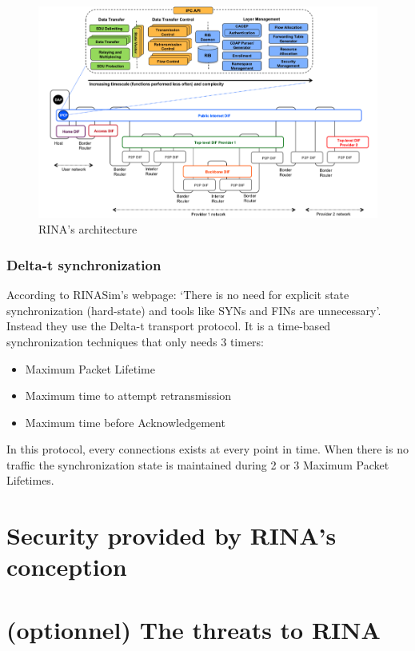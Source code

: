\documentclass[a4paper]{proc}
\begin{document}
\begin{figure}
    \centering\includegraphics[width=\columnwidth]{arch.png}\caption{RINA's architecture}\label{fig:arch}
\end{figure}

\section{Delta-t synchronization}
According to RINASim's webpage: `There is no need for explicit state synchronization (hard-state) and tools like SYNs and FINs are unnecessary'.
Instead they use the Delta-t transport protocol\cite{65288}.
It is a time-based synchronization techniques that only needs 3 timers:
\begin{itemize}
    \item Maximum Packet Lifetime
    \item Maximum time to attempt retransmission
    \item Maximum time before Acknowledgement
\end{itemize}
In this protocol, every connections exists at every point in time.
When there is no traffic the synchronization state is maintained during 2 or 3 Maximum Packet Lifetimes.\cite{rinasim}

\part{Security provided by RINA's conception}

\part{(optionnel) The threats to RINA}

\nocite{*}
\newpage


\end{document}
